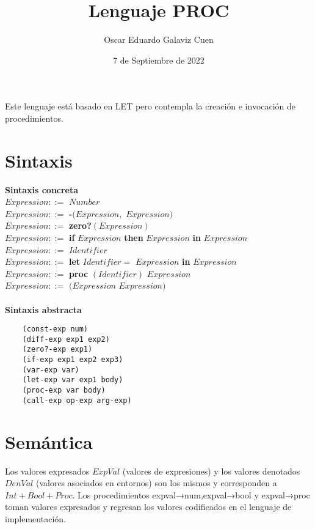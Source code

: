 \documentclass{article}
\title{Lenguaje PROC}
\author{Oscar Eduardo Galaviz Cuen}
\date{7 de Septiembre de 2022}
\begin{document}
\maketitle
    Este lenguaje está basado en LET pero contempla la creación e invocación de procedimientos.
    
    \section{\textbf{Sintaxis}}
    \textbf{Sintaxis concreta}\\
    $Expression ::= $ \textbf{ }$Number$\\
    $Expression ::=$ \textbf{ -}$(Expression,$ $Expression)$\\
    $Expression ::=$ \textbf{ zero?}$(Expression)$\\
    $Expression ::=$ \textbf{ if }$Expression$\textbf{ then }$Expression$\textbf{ in }$Expression$\\
    $Expression ::= $ \textbf{ }$Identifier$\\
    $Expression ::=$ \textbf{ let }$Identifier=$ $Expression$\textbf{ in }$Expression$\\
    $Expression ::=$ \textbf{ proc }$(Identifier)$\textbf{ }$Expression$\\
    $Expression ::=$ \textbf{  }$(Expression$ $Expression)$\\
    \\
    \textbf{Sintaxis abstracta}\\
    \begin{verbatim}
    (const-exp num)
    (diff-exp exp1 exp2)
    (zero?-exp exp1)
    (if-exp exp1 exp2 exp3)
    (var-exp var)
    (let-exp var exp1 body)
    (proc-exp var body)
    (call-exp op-exp arg-exp)
    \end{verbatim}
    
    \section{\textbf{Semántica}}
    Los valores expresados $ExpVal$ (valores de expresiones) y los valores denotados $DenVal$ (valores asociados en entornos) son los mismos y corresponden a $Int+Bool+Proc$. Los procedimientos expval→num,expval→bool y expval→proc toman valores expresados y regresan los valores codificados en el lenguaje de implementación.\\
    
\end{document}
